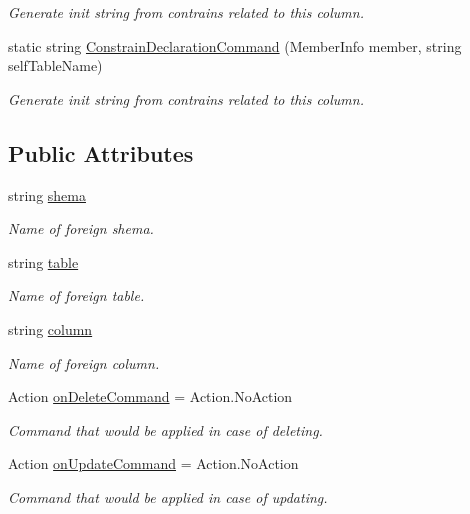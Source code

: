 \begin{DoxyCompactItemize}
\begin{DoxyCompactList}\small\item\em Generate init string from contrains related to this column. \end{DoxyCompactList}\item 
static string \mbox{\hyperlink{class_uniform_data_operator_1_1_sql_1_1_tables_1_1_attributes_1_1_is_foreign_key_a3be04c1c635f48545cc4cc858dca4a24}{Constrain\+Declaration\+Command}} (Member\+Info member, string self\+Table\+Name)
\begin{DoxyCompactList}\small\item\em Generate init string from contrains related to this column. \end{DoxyCompactList}\end{DoxyCompactItemize}
\subsection*{Public Attributes}
\begin{DoxyCompactItemize}
\item 
string \mbox{\hyperlink{class_uniform_data_operator_1_1_sql_1_1_tables_1_1_attributes_1_1_is_foreign_key_a945933c510b66a8d5a2002be79e3815e}{shema}}
\begin{DoxyCompactList}\small\item\em Name of foreign shema. \end{DoxyCompactList}\item 
string \mbox{\hyperlink{class_uniform_data_operator_1_1_sql_1_1_tables_1_1_attributes_1_1_is_foreign_key_ae128ed2e6e2da4eaa77f53149faa65ce}{table}}
\begin{DoxyCompactList}\small\item\em Name of foreign table. \end{DoxyCompactList}\item 
string \mbox{\hyperlink{class_uniform_data_operator_1_1_sql_1_1_tables_1_1_attributes_1_1_is_foreign_key_ac72b1494342f1c0d0c3241a142d18e46}{column}}
\begin{DoxyCompactList}\small\item\em Name of foreign column. \end{DoxyCompactList}\item 
Action \mbox{\hyperlink{class_uniform_data_operator_1_1_sql_1_1_tables_1_1_attributes_1_1_is_foreign_key_a8f4a8e2694b95aae6e595f57aed802b5}{on\+Delete\+Command}} = Action.\+No\+Action
\begin{DoxyCompactList}\small\item\em Command that would be applied in case of deleting. \end{DoxyCompactList}\item 
Action \mbox{\hyperlink{class_uniform_data_operator_1_1_sql_1_1_tables_1_1_attributes_1_1_is_foreign_key_a81e0fcd68bd1d9c17be4c9f853f6b815}{on\+Update\+Command}} = Action.\+No\+Action
\begin{DoxyCompactList}\small\item\em Command that would be applied in case of updating. \end{DoxyCompactList}\end{DoxyCompactItemize}


